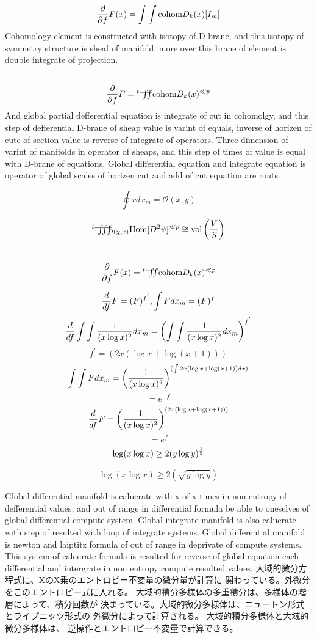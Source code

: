 \documentclass{jsarticle}
\begin{document}
 $$ {\partial \over \partial f}F(x) = \int \int \text{cohom}D_k(x)[I_m]  $$
 Cohomology element is constructed with isotopy of D-brane,
 and this isotopy of symmetry structure is sheaf of manifold,
 more over this brane of element is double integrate of projection.
 $$ {\partial \over \partial f}F = {{}^t \variint} \text{cohom}D_k(x)^{\ll p} $$
 And global partial defferential equation is integrate of cut in cohomolgy,
 and this step of defferential D-brane of sheap value is varint of equals,
 inverse of horizen of cute of section value is reverse of integrate of 
 operators. Three dimension of varint of manifolds in operator of sheaps,
 and this step of times of value is equal with D-brane of equations.
 Global differential equation and integrate equation is operator of 
 global scales of horizen cut and add of cut equation are routs.

 $$ \oint r dx_m = \mathcal{O}(x,y) $$

 $$ {{}^t \variiint}_{{D(\chi,x)}} \text{Hom}[D^2 \psi]^{\ll p} \cong 
 \text{vol}\left({V \over S}\right) $$

 $$ {\partial \over \partial f}F(x) = {{}^t \variint} 
 \text{cohom}D_k(x)^{\ll p} $$

 $$ {d \over df}F = (F)^{f^{'}}, \int F dx_m = (F)^{f}  $$
 $$ {d \over df}\int \int{1 \over (x \log x)^2}dx_m =
 \left(\int \int{1 \over (x \log x)^2}dx_m \right)^{f^{'}}  $$
 $$ f^{'} = (2x (\log x + \log (x + 1))) $$
  $$  \int \int F dx_m = \left({1 \over (x \log x)^2}\right)^{
	  (\int 2x (\log x + \log (x + 1))dx)} $$ 
   $$= e^{-f} $$
  $$ {d \over df}F = \left({1 \over (x \log x)^2}\right)^{
	  (2x (\log x + \log (x + 1))) } $$  
  $$= e^{f} $$
  $$ \log (x \log x) \ge 2(y \log y)^{1 \over 2} $$

  $$ \log (x \log x) \ge 2(\sqrt{y \log y}) $$

  Global differential manifold is calucrate with x of x times in non
  entropy of defferential values, and out of range in differential formula
  be able to oneselves of global differential compute system.
  Global integrate manifold is also calucrate with step of resulted with
  loop of integrate systems. Global differential manifold is newton and 
  laiptitz formula of out of range in deprivate of compute systems.
  This system of calcurate formula is resulted for reverse of global equation
  each differential and intergrate in non entropy compute resulted values.
  大域的微分方程式に、XのX乗のエントロピー不変量の微分量が計算に
  関わっている。外微分をこのエントロピー式に入れる。
  大域的積分多様体の多重積分は、多様体の階層によって、積分回数が
  決まっている。大域的微分多様体は、ニュートン形式とライプニッツ形式の
  外微分によって計算される。 大域的積分多様体と大域的微分多様体は、
  逆操作とエントロピー不変量で計算できる。
\end{document}
